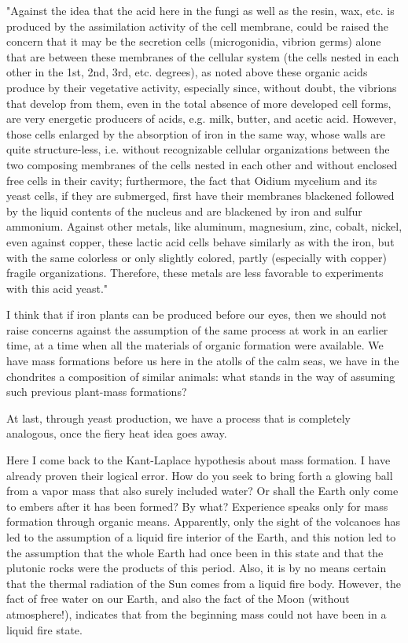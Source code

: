 \documentclass[a4paper, 12pt, oneside]{article}
\begin{document}
"Against the idea that the acid here in the fungi as well as the resin, wax, etc. is produced by the assimilation activity of the cell membrane, could be raised the concern that it may be the secretion cells (microgonidia, vibrion germs) alone that are between these membranes of the cellular system (the cells nested in each other in the 1st, 2nd, 3rd, etc. degrees), as noted above these organic acids produce by their vegetative activity, especially since, without doubt, the vibrions that develop from them, even in the total absence of more developed cell forms, are very energetic producers of acids, e.g. milk, butter, and acetic acid. However, those cells enlarged by the absorption of iron in the same way, whose walls are quite structure-less, i.e. without recognizable cellular organizations between the two composing membranes of the cells nested in each other and without enclosed free cells in their cavity; furthermore, the fact that Oidium mycelium and its yeast cells, if they are submerged, first have their membranes blackened followed by the liquid contents of the nucleus and are blackened by iron and sulfur ammonium. Against other metals, like aluminum, magnesium, zinc, cobalt, nickel, even against copper, these lactic acid cells behave similarly as with the iron, but with the same colorless or only slightly colored, partly (especially with copper) fragile organizations. Therefore, these metals are less favorable to experiments with this acid yeast."

I think that if iron plants can be produced before our eyes, then we should not raise concerns against the assumption of the same process at work in an earlier time, at a time when all the materials of organic formation were available. We have mass formations before us here in the atolls of the calm seas, we have in the chondrites a composition of similar animals: what stands in the way of assuming such previous plant-mass formations?

At last, through yeast production, we have a process that is completely analogous, once the fiery heat idea goes away.

Here I come back to the Kant-Laplace hypothesis about mass formation. I have already proven their logical error. How do you seek to bring forth a glowing ball from a vapor mass that also surely included water? Or shall the Earth only come to embers after it has been formed? By what? Experience speaks only for mass formation through organic means. Apparently, only the sight of the volcanoes has led to the assumption of a liquid fire interior of the Earth, and this notion led to the assumption that the whole Earth had once been in this state and that the plutonic rocks were the products of this period. Also, it is by no means certain that the thermal radiation of the Sun comes from a liquid fire body. However, the fact of free water on our Earth, and also the fact of the Moon (without atmosphere!), indicates that from the beginning mass could not have been in a liquid fire state.
\end{document}
